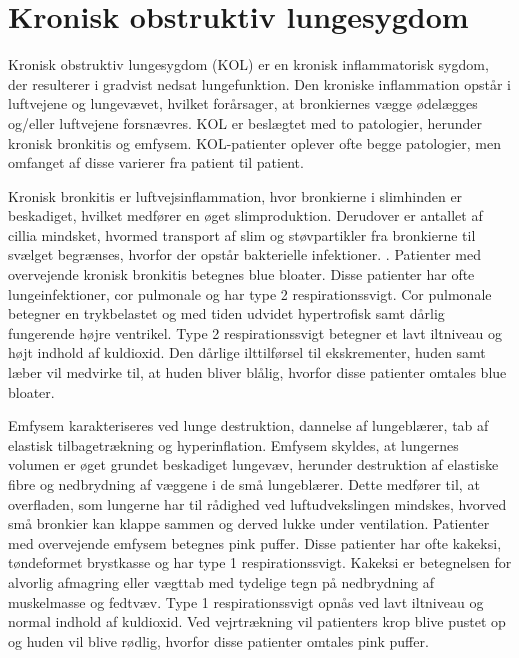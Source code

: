 \section{Kronisk obstruktiv lungesygdom}
Kronisk obstruktiv lungesygdom (KOL) er en kronisk inflammatorisk sygdom, der resulterer i gradvist nedsat lungefunktion. Den kroniske inflammation opstår i luftvejene og lungevævet, hvilket forårsager, at bronkiernes vægge ødelægges og/eller luftvejene forsnævres.\cite{Basisbogen2016} KOL er beslægtet med to patologier, herunder kronisk bronkitis og emfysem. KOL-patienter oplever ofte begge patologier, men omfanget af disse varierer fra patient til patient.\cite{Basisbogen2016,Healthguidances2016}

Kronisk bronkitis er luftvejsinflammation, hvor bronkierne i slimhinden er beskadiget, hvilket medfører en øget slimproduktion. Derudover er antallet af cillia mindsket, hvormed transport af slim og støvpartikler fra bronkierne til svælget begrænses, hvorfor der opstår bakterielle infektioner. \cite{Frausing2011, Britannica2016}. Patienter med overvejende kronisk bronkitis betegnes blue bloater. Disse patienter har ofte lungeinfektioner, cor pulmonale og har type 2 respirationssvigt. Cor pulmonale betegner en trykbelastet og med tiden udvidet hypertrofisk samt dårlig fungerende højre ventrikel. Type 2 respirationssvigt betegner et lavt iltniveau og højt indhold af kuldioxid. Den dårlige ilttilførsel til ekskrementer, huden samt læber vil medvirke til, at huden bliver blålig, hvorfor disse patienter omtales blue bloater. \cite{Healthguidances2016}

Emfysem karakteriseres ved lunge destruktion, dannelse af lungeblærer, tab af elastisk tilbagetrækning og hyperinflation. Emfysem skyldes, at lungernes volumen er øget grundet beskadiget lungevæv, herunder destruktion af elastiske fibre og nedbrydning af væggene i de små lungeblærer. Dette medfører til, at overfladen, som lungerne har til rådighed ved luftudvekslingen mindskes, hvorved små bronkier kan klappe sammen og derved lukke under ventilation.\cite{Frausing2011a,Flaschen-Hansen2008} Patienter med overvejende emfysem betegnes pink puffer. Disse patienter har ofte kakeksi, tøndeformet brystkasse og har type 1 respirationssvigt. Kakeksi er betegnelsen for alvorlig afmagring eller vægttab med tydelige tegn på nedbrydning af muskelmasse og fedtvæv. Type 1 respirationssvigt opnås ved lavt iltniveau og normal indhold af kuldioxid. Ved vejrtrækning vil patienters krop blive pustet op og huden vil blive rødlig, hvorfor disse patienter omtales pink puffer.\cite{Healthguidances2016}

